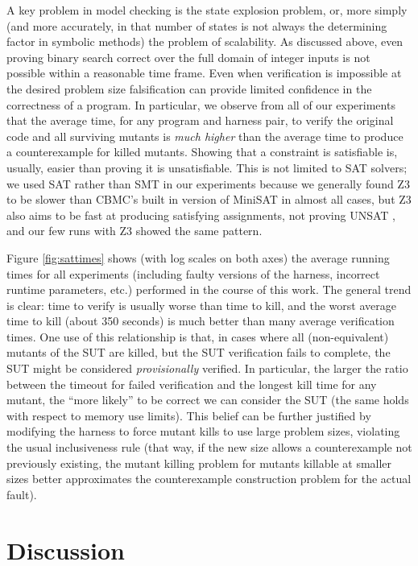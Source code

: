 \documentclass[conference]{IEEEtran}
\begin{document}
A key problem in model checking is the state explosion problem, or,
more simply (and more accurately, in that number of states is not
always the determining factor in symbolic methods) the problem of
scalability.  As discussed above, even proving binary search correct
over the full domain of integer inputs is not possible within a
reasonable time frame.  Even when verification is impossible at the
desired problem size falsification can provide limited
confidence in the correctness of a program.  In particular, we observe
from all of our experiments that the average time, for any program and
harness pair, to verify the original code and all surviving mutants is
\emph{much higher} than the average time to produce a counterexample
for killed mutants.  Showing that a constraint is satisfiable is,
usually, easier than proving it is unsatisfiable.  This is not limited
to SAT solvers; we used SAT rather than SMT in our experiments because
we generally found Z3 to be slower than CBMC's built in version of
MiniSAT\cite{minisat} in almost all cases, but Z3 also
aims to be fast at producing satisfying assignments, not proving UNSAT
\cite{z3}, and our few runs with Z3 showed the same pattern.

Figure \ref{fig:sattimes} shows (with log scales on both axes) the
average running times for all experiments (including faulty versions
of the harness, incorrect runtime parameters, etc.) performed in the
course of this work.  The general trend is clear: time to verify is
usually worse than time to kill, and the worst average time to kill
(about 350 seconds) is much better than many average verification
times.  One use of this relationship is that, in cases where all
(non-equivalent) mutants of the SUT are killed, but the SUT
verification fails to complete, the SUT might be considered
\emph{provisionally} verified. In particular, the larger the ratio
between the timeout for failed verification and the longest kill time
for any mutant, the ``more likely'' to be correct we can consider the
SUT (the same holds with respect to memory use limits). This belief can
be further justified by modifying the harness to force mutant kills to
use large problem sizes, violating the usual inclusiveness rule (that
way, if the new size allows a counterexample not previously existing,
the mutant killing problem for mutants killable at smaller sizes
better approximates the counterexample construction problem for the
actual fault).

\section{Discussion}
\end{document}
